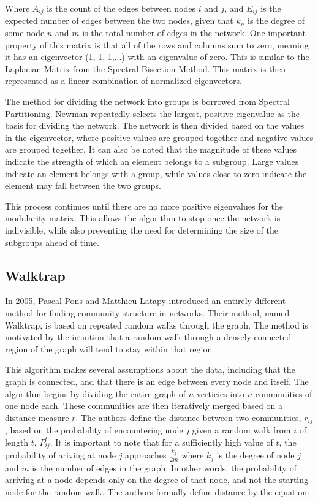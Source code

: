 \documentclass{article}
\begin{document}
    Where $A_{ij}$ is the count of the edges between nodes $i$ and $j$, and $E_{ij}$ is the expected number of edges between the two nodes, given that $k_n$ is the degree of some node $n$ and $m$ is the total number of edges in the network. One important property of this matrix is that all of the rows and columns sum to zero, meaning it has an eigenvector (1, 1, 1,...) with an eigenvalue of zero. This is similar to the Laplacian Matrix from the Spectral Bisection Method. This matrix is then represented as a linear combination of normalized eigenvectors.
    \par
    The method for dividing the network into groups is borrowed from Spectral Partitioning. Newman repeatedly selects the largest, positive eigenvalue as the basis for dividing the network. The network is then divided based on the values in the eigenvector, where positive values are grouped together and negative values are grouped together. It can also be noted that the magnitude of these values indicate the strength of which an element belongs to a subgroup. Large values indicate an element belongs with a group, while values close to zero indicate the element may fall between the two groups.
    \par
    This process continues until there are no more positive eigenvalues for the modularity matrix. This allows the algorithm to stop once the network is indivisible, while also preventing the need for determining the size of the subgroups ahead of time.

    \subsection{Walktrap}
    In 2005, Pascal Pons and Matthieu Latapy introduced an entirely different method for finding community structure in networks. Their method, named Walktrap, is based on repeated random walks through the graph. The method is motivated by the intuition that a random walk through a densely connected region of the graph will tend to stay within that region \cite{10.1007/11569596_31}.
    \par
    This algorithm makes several assumptions about the data, including that the graph is connected, and that there is an edge between every node and itself. The algorithm begins by dividing the entire graph of $n$ verticies into $n$ communities of one node each. These communities are then iteratively merged based on a distance measure $r$. The authors define the distance between two communities, $r_{ij}$, based on the probability of encountering node $j$ given a random walk from $i$ of length $t$, $P^t_{ij}$. It is important to note that for a sufficiently high value of $t$, the probability of ariving at node $j$ approaches $\frac{k_j}{2m}$ where $k_j$ is the degree of node $j$ and $m$ is the number of edges in the graph. In other words, the probability of arriving at a node depends only on the degree of that node, and not the starting node for the random walk. The authors formally define distance by the equation:
\end{document}
